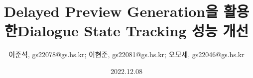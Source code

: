 \title{Delayed Preview Generation을 활용한\linebreak Dialogue State Tracking 성능 개선}
\authorstyle{}%
\author{이준석, gs22078@gs.hs.kr; 이현준, gs22081@gs.hs.kr; 오모세, gs22046@gs.hs.kr}
\date{2022.12.08}
